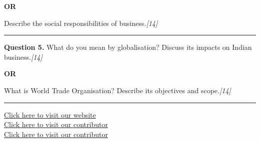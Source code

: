\documentclass[11pt,a4paper]{article}
\newcommand{\pts}[1]{\hfill   \textit{[#1]}}
\begin{document}
\centerline{   \textbf{OR}}

Describe the social responsibilities of business.\pts{14}

\medskip\rule{\linewidth}{0.2pt}




\noindent   \textbf{Question 5.}
What do you mean by globalisation? Discuss its impacts on Indian business.\pts{14}

\centerline{   \textbf{OR}}

What is World Trade Organisation? Describe its objectives and scope.\pts{14}

\vfill
\rule{\linewidth}{0.4pt}

\begin{center}\small
\href{https://bhu-exam.vercel.app/}{Click here to visit our website}\\[4pt]
\href{https://me-aryan.vercel.app/}{Click here to visit our contributor}\\[4pt]
\href{https://quashan-me.vercel.app/}{Click here to visit our contributor}
\end{center}
\end{document}
